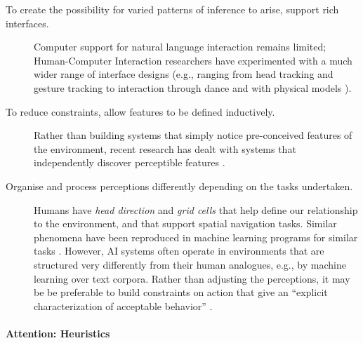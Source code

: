 \begin{description}
\item[To create the possibility for varied patterns of inference to arise, support rich interfaces.] 
Computer support for natural
  language interaction remains limited; Human-Computer Interaction
  researchers have experimented with a much wider range of interface
  designs (e.g., ranging from 
head tracking and gesture tracking \cite{turk2000perceptive} to
interaction through dance \cite{jacob2015viewpoints}
  and with physical models \cite{stopher2017technology}).
\item[To reduce constraints, allow features to be defined inductively.]
Rather than building systems that simply notice
  pre-conceived features of the environment, recent research has dealt
  with systems that independently discover perceptible features
  \cite{inceptionism}.
\item[Organise and process perceptions differently depending on the tasks undertaken.]
 Humans have \emph{head direction} and \emph{grid cells} that
  help define our relationship to the environment, and that support
  spatial navigation tasks.  Similar phenomena have been reproduced in
  machine learning programs for similar tasks \cite{Banino2018,cueva2018emergence}.
  However, AI systems often operate in environments that are
  structured very differently from their human analogues, e.g., by
  machine learning over text corpora.  Rather than adjusting the
  perceptions, it may be be preferable to build constraints on action
  that give an ``explicit characterization of acceptable behavior''
  \cite[p.~356]{caliskan2017semantics}.
\end{description}

\paragraph{\textbf{\upshape Attention: Heuristics}}

